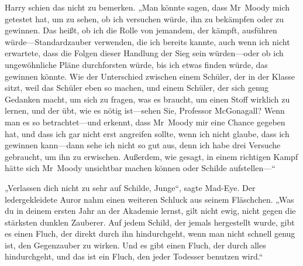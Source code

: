 Harry schien das nicht zu bemerken. „Man könnte sagen, dass Mr~Moody mich getestet hat, um zu sehen, ob ich versuchen würde, ihn zu bekämpfen oder zu gewinnen. Das heißt, ob ich die Rolle von jemandem, der kämpft, ausführen würde—Standardzauber verwenden, die ich bereits kannte, auch wenn ich nicht erwartete, dass die Folgen dieser Handlung der Sieg sein würden—oder ob ich ungewöhnliche Pläne durchforsten würde, bis ich etwas finden würde, das gewinnen könnte. Wie der Unterschied zwischen einem Schüler, der in der Klasse sitzt, weil das Schüler eben so machen, und einem Schüler, der sich genug Gedanken macht, um sich zu fragen, was es braucht, um einen Stoff wirklich zu lernen, und der übt, wie es nötig ist—sehen Sie, Professor McGonagall? Wenn man es so betrachtet—und erkennt, dass Mr~Moody mir eine Chance gegeben hat, und dass ich gar nicht erst angreifen sollte, wenn ich nicht glaube, dass ich gewinnen kann—dann sehe ich nicht so gut aus, denn ich habe drei Versuche gebraucht, um ihn zu erwischen. Außerdem, wie gesagt, in einem richtigen Kampf hätte sich Mr~Moody unsichtbar machen können oder Schilde aufstellen—“

„Verlassen dich nicht zu sehr auf Schilde, Junge“, sagte Mad-Eye. Der ledergekleidete Auror nahm einen weiteren Schluck aus seinem Fläschchen. „Was du in deinem ersten Jahr an der Akademie lernst, gilt nicht ewig, nicht gegen die stärksten dunklen Zauberer. Auf jedem Schild, der jemals hergestellt wurde, gibt es einen Fluch, der direkt durch ihn hindurchgeht, wenn man nicht schnell genug ist, den Gegenzauber zu wirken. Und es gibt einen Fluch, der durch alles hindurchgeht, und das ist ein Fluch, den jeder Todesser benutzen wird.“

